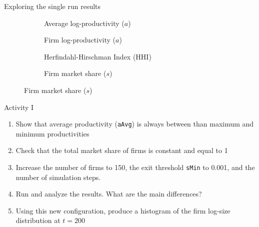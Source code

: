 \documentclass[bigger,aspectratio=169]{beamer}
\begin{document}
\begin{frame}[label={sec:org5d525a7}]{Exploring the single run results}
\begin{figure}[ht]
    \begin{subfigure}{0.48\textwidth}
        \centering
        
        \caption{Average log-productivity ($a$)}
        \label{fig:avg_prod}
    \end{subfigure}
    \hfill
    \begin{subfigure}{0.48\textwidth}
        \centering
        
        \caption{Firm log-productivity ($a$)}
        \label{fig:firm_prod}
    \end{subfigure}

    \begin{subfigure}{0.48\textwidth}
        \centering
        
        \caption{Herfindahl-Hirschman Index (HHI)}
        \label{fig:hhi}
    \end{subfigure}
    \hfill
    \begin{subfigure}{0.48\textwidth}
        \centering
        
        \caption{Firm market share ($s$)}
        \label{fig:market_share}
    \end{subfigure}
    \label{single-run-industry}
\end{figure}
\end{frame}
\begin{frame}[label={sec:org645bb70},fragile]{Activity I}
 \begin{enumerate}
\item Show that average productivity (\texttt{aAvg}) is always between than maximum and minimum productivities
\item Check that the total market share of firms is constant and equal to 1
\item Increase the number of firms to 150, the exit threshold \texttt{sMin} to 0.001, and the number of simulation steps.
\item Run and analyze the results. What are the main differences?
\item Using this new configuration, produce a \alert{histogram} of the firm log-size distribution at \(t = 200\)
\end{enumerate}
\end{frame}
\end{document}
